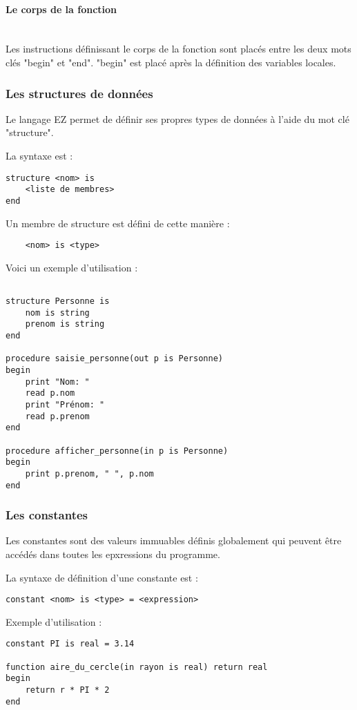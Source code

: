 \paragraph{Le corps de la fonction}\mbox{} \\

Les instructions définissant le corps de la fonction sont placés entre les deux
mots clés "begin" et "end". "begin" est placé après la définition des
variables locales.


\subsubsection{Les structures de données}

Le langage EZ permet de définir ses propres types de données à l'aide
du mot clé "structure".

La syntaxe est :
\begin{verbatim}
structure <nom> is
    <liste de membres>
end
\end{verbatim}

Un membre de structure est défini de cette manière :
\begin{verbatim}
    <nom> is <type>
\end{verbatim}

Voici un exemple d'utilisation :
\begin{verbatim}

structure Personne is
    nom is string
    prenom is string
end

procedure saisie_personne(out p is Personne)
begin
    print "Nom: "
    read p.nom
    print "Prénom: "
    read p.prenom
end

procedure afficher_personne(in p is Personne)
begin
    print p.prenom, " ", p.nom
end

\end{verbatim}


\subsubsection{Les constantes}

Les constantes sont des valeurs immuables définis globalement qui peuvent être
accédés dans toutes les epxressions du programme.

La syntaxe de définition d'une constante est :
\begin{verbatim}
constant <nom> is <type> = <expression>
\end{verbatim}

Exemple d'utilisation :
\begin{verbatim}
constant PI is real = 3.14

function aire_du_cercle(in rayon is real) return real
begin
    return r * PI * 2
end
\end{verbatim}


